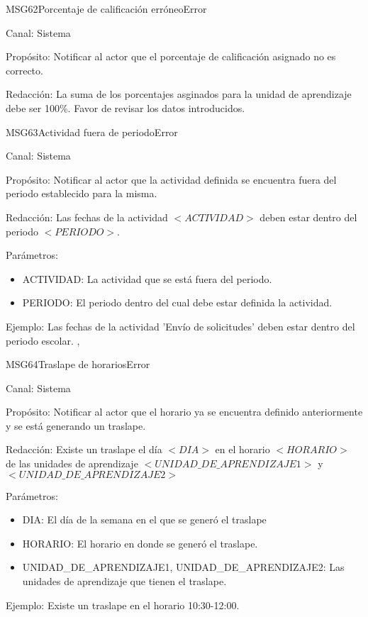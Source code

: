 \begin{mensaje}{MSG62}{Porcentaje de calificación erróneo}{Error}
	\item[Canal:] Sistema
	\item[Propósito:] Notificar al actor que el porcentaje de calificación asignado no es correcto.
	\item[Redacción:] La suma de los porcentajes asginados para la unidad de aprendizaje debe ser 100\%. Favor de revisar los datos introducidos.	
\end{mensaje}

\begin{mensaje}{MSG63}{Actividad fuera de periodo}{Error}
	\item[Canal:] Sistema
	\item[Propósito:] Notificar al actor que la actividad definida se encuentra fuera del periodo establecido para la misma.
	\item[Redacción:] Las fechas de la actividad $<ACTIVIDAD>$ deben estar dentro del periodo $<PERIODO>$.
	\item[Parámetros:] 
	\begin{itemize}
		\item ACTIVIDAD: La actividad que se está fuera del periodo.
		\item PERIODO: El periodo dentro del cual debe estar definida la actividad.
	\end{itemize}
	\item[Ejemplo:] Las fechas de la actividad 'Envío de solicitudes' deben estar dentro del periodo escolar.
	, 
\end{mensaje}

\begin{mensaje}{MSG64}{Traslape de horarios}{Error}
	\item[Canal:] Sistema
	\item[Propósito:] Notificar al actor que el horario ya se encuentra definido anteriormente y se está generando un traslape.
	\item[Redacción:] Existe un traslape el día $<DIA>$ en el horario $<HORARIO>$ de las unidades de aprendizaje $<UNIDAD\_DE\_APRENDIZAJE1>$ y $<UNIDAD\_DE\_APRENDIZAJE2>$
	\item[Parámetros:] \cdtEmpty
	\begin{itemize}
		\item DIA: El día de la semana en el que se generó el traslape
		\item HORARIO: El horario en donde se generó el traslape.
		\item UNIDAD\_DE\_APRENDIZAJE1, UNIDAD\_DE\_APRENDIZAJE2: Las unidades de aprendizaje que tienen el traslape.
	\end{itemize}
	\item[Ejemplo:] Existe un traslape en el horario 10:30-12:00.
\end{mensaje}

